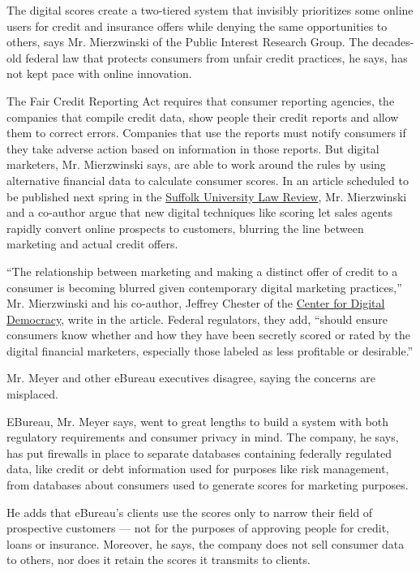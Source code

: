 The digital scores create a two-tiered system that invisibly prioritizes
some online users for credit and insurance offers while denying the same
opportunities to others, says Mr. Mierzwinski of the Public Interest
Research Group. The decades-old federal law that protects consumers from
unfair credit practices, he says, has not kept pace with online
innovation.

The Fair Credit Reporting Act requires that consumer reporting agencies,
the companies that compile credit data, show people their credit reports
and allow them to correct errors. Companies that use the reports must
notify consumers if they take adverse action based on information in
those reports. But digital marketers, Mr. Mierzwinski says, are able to
work around the rules by using alternative financial data to calculate
consumer scores. In an article scheduled to be published next spring in
the
\href{http://www.law.suffolk.edu/highlights/stuorgs/lawreview/index.cfm}{Suffolk
University Law Review}, Mr. Mierzwinski and a co-author argue that new
digital techniques like scoring let sales agents rapidly convert online
prospects to customers, blurring the line between marketing and actual
credit offers.

``The relationship between marketing and making a distinct offer of
credit to a consumer is becoming blurred given contemporary digital
marketing practices,'' Mr. Mierzwinski and his co-author, Jeffrey
Chester of the \href{http://www.democraticmedia.org/}{Center for Digital
Democracy}, write in the article. Federal regulators, they add, ``should
ensure consumers know whether and how they have been secretly scored or
rated by the digital financial marketers, especially those labeled as
less profitable or desirable.''

Mr. Meyer and other eBureau executives disagree, saying the concerns are
misplaced.

EBureau, Mr. Meyer says, went to great lengths to build a system with
both regulatory requirements and consumer privacy in mind. The company,
he says, has put firewalls in place to separate databases containing
federally regulated data, like credit or debt information used for
purposes like risk management, from databases about consumers used to
generate scores for marketing purposes.

He adds that eBureau's clients use the scores only to narrow their field
of prospective customers --- not for the purposes of approving people
for credit, loans or insurance. Moreover, he says, the company does not
sell consumer data to others, nor does it retain the scores it transmits
to clients.

